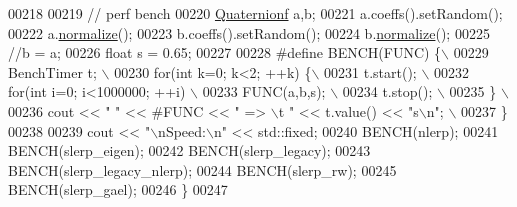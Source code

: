\begin{DoxyCode}
00218   
00219   \textcolor{comment}{// perf bench}
00220   \hyperlink{group___geometry___module_class_eigen_1_1_quaternion}{Quaternionf} a,b;
00221   a.coeffs().setRandom();
00222   a.\hyperlink{group___geometry___module_aa8d67d855940925f634327827aed1cad}{normalize}();
00223   b.coeffs().setRandom();
00224   b.\hyperlink{group___geometry___module_aa8d67d855940925f634327827aed1cad}{normalize}();
00225   \textcolor{comment}{//b = a;}
00226   \textcolor{keywordtype}{float} s = 0.65;
00227     
00228 \textcolor{preprocessor}{  #define BENCH(FUNC) \{\(\backslash\)}
00229 \textcolor{preprocessor}{    BenchTimer t; \(\backslash\)}
00230 \textcolor{preprocessor}{    for(int k=0; k<2; ++k) \{\(\backslash\)}
00231 \textcolor{preprocessor}{      t.start(); \(\backslash\)}
00232 \textcolor{preprocessor}{      for(int i=0; i<1000000; ++i) \(\backslash\)}
00233 \textcolor{preprocessor}{        FUNC(a,b,s); \(\backslash\)}
00234 \textcolor{preprocessor}{      t.stop(); \(\backslash\)}
00235 \textcolor{preprocessor}{    \} \(\backslash\)}
00236 \textcolor{preprocessor}{    cout << "  " << #FUNC << " => \(\backslash\)t " << t.value() << "s\(\backslash\)n"; \(\backslash\)}
00237 \textcolor{preprocessor}{  \}}
00238   
00239   cout << \textcolor{stringliteral}{"\(\backslash\)nSpeed:\(\backslash\)n"} << std::fixed;
00240   BENCH(nlerp);
00241   BENCH(slerp\_eigen);
00242   BENCH(slerp\_legacy);
00243   BENCH(slerp\_legacy\_nlerp);
00244   BENCH(slerp\_rw);
00245   BENCH(slerp\_gael);
00246 \}
00247 
\end{DoxyCode}

